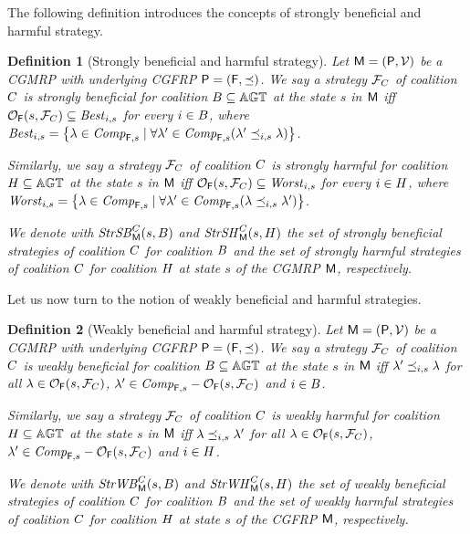 \documentclass{article}
\newtheorem{definition}{Definition}
\begin{document}
The following definition introduces the concepts
of strongly beneficial and harmful strategy.
\begin{definition}[Strongly beneficial and harmful strategy]\label{def: strong help and harm}
Let $\mathsf{M} = (\mathsf{P}, \mathcal{V})$ be a CGMRP with underlying CGFRP $\mathsf{P} = (\mathsf{F}, \preceq)$. We say a strategy $\mathcal{F}_C$ of coalition $C$ is strongly beneficial for coalition $B\subseteq \mathbb{AGT}$ at the state $s$
in $\mathsf{M}$ 
 iff $\mathcal{O}_{\mathsf{F}}(s,\mathcal{F}_C)\subseteq \mathit{Best}_{i,s}$ for every $i\in B $, where $\mathit{Best}_{i,s} = \big\{\lambda\in \mathit{Comp}_{\mathsf{F},s}\mid \forall \lambda'\in \mathit{Comp}_{\mathsf{F},s} (\lambda'  \preceq _{i,s} \lambda)  \big\}$.

 Similarly, we say a strategy $\mathcal{F}_C$ of coalition $C$ is strongly harmful for coalition  $H\subseteq \mathbb{AGT}$
at the state $s$
in $\mathsf{M}$
 iff $\mathcal{O}_{\mathsf{F}}(s,\mathcal{F}_C)\subseteq \mathit{Worst}_{i,s}$  for every $i\in H $, where $\mathit{Worst}_{i,s} = 
 \big\{\lambda\in \mathit{Comp}_{\mathsf{F},s}\mid \forall \lambda'\in \mathit{Comp}_{\mathsf{F},s} (\lambda \preceq _{i,s} \lambda') \big\}$.
 
We denote with  $\mathit{StrSB}_{\mathsf{M}}^C(s,B)$ and $\mathit{StrSH}_{\mathsf{M}}^C(s,H)$
the set of strongly beneficial
strategies of coalition $C$
for coalition $B$ 
and
the set of strongly harmful 
strategies of coalition $C$
for coalition $H$ at state $s$
of the CGMRP $\mathsf{M}$, respectively.
\end{definition}

Let us now turn to the notion of  weakly beneficial and harmful strategies.
\begin{definition}[Weakly beneficial and harmful strategy]\label{def: weak help and harm}
Let $\mathsf{M} = (\mathsf{P}, \mathcal{V})$ be a CGMRP with underlying CGFRP $\mathsf{P} = (\mathsf{F}, \preceq)$.
We say a strategy $\mathcal{F}_C$ of coalition $C$ is weakly beneficial for coalition $B\subseteq \mathbb{AGT}$ at the state $s$
in $\mathsf{M}$
 iff $\lambda' \preceq_{i,s} \lambda$ for all $\lambda\in \mathcal{O}_{\mathsf{F}}(s,\mathcal{F}_C)$, $\lambda'\in \mathit{Comp}_{\mathsf{F},s}-\mathcal{O}_{\mathsf{F}}(s,\mathcal{F}_C)$ and $i\in B $.

 Similarly, we say a strategy $\mathcal{F}_C$ of coalition $C$ is weakly harmful for coalition $H\subseteq \mathbb{AGT}$ at the state $s$
in $\mathsf{M}$ iff  $\lambda \preceq_{i,s} \lambda'$ for all $\lambda\in \mathcal{O}_{\mathsf{F}}(s,\mathcal{F}_C)$, $\lambda'\in \mathit{Comp}_{\mathsf{F},s}-\mathcal{O}_{\mathsf{F}}(s,\mathcal{F}_C)$ and $i\in H $.
 
We denote with $\mathit{StrWB}_{\mathsf{M}}^C(s,B)$ and $\mathit{StrWH}_{\mathsf{M} }^C(s,H)$
the set of weakly beneficial
strategies of coalition $C$
for coalition $B$ and
the set of weakly  harmful 
strategies of coalition $C$
for coalition $H$ 
at state $s$
of the CGFRP $\mathsf{M}$, respectively.
\end{definition}
\end{document}
